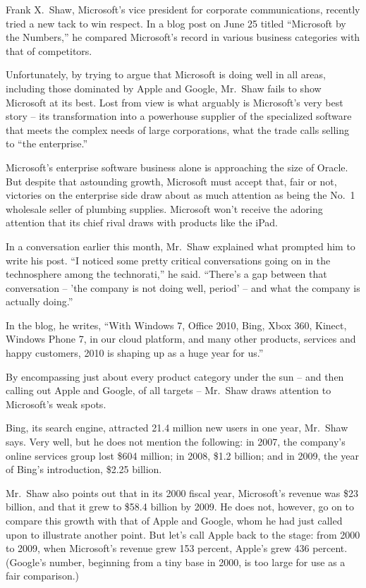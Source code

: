 ﻿\documentclass[12pt]{article}
\begin{document}
Frank X.~Shaw, Microsoft's vice president for corporate communications, recently tried a new tack to
win respect. In a blog post on June 25 titled ``Microsoft by the Numbers,'' he compared Microsoft's
record in various business categories with that of competitors.

Unfortunately, by trying to argue that Microsoft is doing well in all areas, including those
dominated by Apple and Google, Mr.~Shaw fails to show Microsoft at its best. Lost from view is what
arguably is Microsoft's very best story -- its transformation into a powerhouse supplier of the
specialized software that meets the complex needs of large corporations, what the trade calls
selling to ``the enterprise.''

Microsoft's enterprise software business alone is approaching the size of Oracle. But despite that
astounding growth, Microsoft must accept that, fair or not, victories on the enterprise side draw
about as much attention as being the No.~1 wholesale seller of plumbing supplies. Microsoft won't
receive the adoring attention that its chief rival draws with products like the iPad.

In a conversation earlier this month, Mr.~Shaw explained what prompted him to write his post. ``I
noticed some pretty critical conversations going on in the technosphere among the technorati,'' he
said. ``There's a gap between that conversation -- 'the company is not doing well, period' -- and
what the company is actually doing.''

In the blog, he writes, ``With Windows 7, Office 2010, Bing, Xbox 360, Kinect, Windows Phone 7, in
our cloud platform, and many other products, services and happy customers, 2010 is shaping up as a
huge year for us.''

By encompassing just about every product category under the sun -- and then calling out Apple and
Google, of all targets -- Mr.~Shaw draws attention to Microsoft's weak spots.

Bing, its search engine, attracted 21.4 million new users in one year, Mr.~Shaw says. Very well, but
he does not mention the following: in 2007, the company's online services group lost \$604 million;
in 2008, \$1.2 billion; and in 2009, the year of Bing's introduction, \$2.25 billion.

Mr.~Shaw also points out that in its 2000 fiscal year, Microsoft's revenue was \$23 billion, and
that it grew to \$58.4 billion by 2009. He does not, however, go on to compare this growth with that
of Apple and Google, whom he had just called upon to illustrate another point. But let's call Apple
back to the stage: from 2000 to 2009, when Microsoft's revenue grew 153 percent, Apple's grew 436
percent. (Google's number, beginning from a tiny base in 2000, is too large for use as a fair
comparison.)
\end{document}
